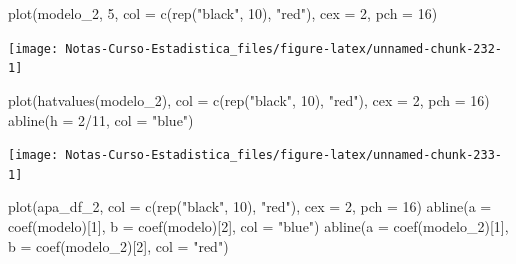\documentclass[
  12pt,
]{book}
\newenvironment{Shaded}{\begin{snugshade}}{\end{snugshade}}
\newcommand{\AttributeTok}[1]{\textcolor[rgb]{0.77,0.63,0.00}{#1}}
\newcommand{\DecValTok}[1]{\textcolor[rgb]{0.00,0.00,0.81}{#1}}
\newcommand{\FunctionTok}[1]{\textcolor[rgb]{0.00,0.00,0.00}{#1}}
\newcommand{\NormalTok}[1]{#1}
\newcommand{\SpecialCharTok}[1]{\textcolor[rgb]{0.00,0.00,0.00}{#1}}
\newcommand{\StringTok}[1]{\textcolor[rgb]{0.31,0.60,0.02}{#1}}
\theoremstyle{definition}
\theoremstyle{definition}
\theoremstyle{definition}
\theoremstyle{remark}
\begin{document}
\begin{Shaded}
\begin{Highlighting}[]
\FunctionTok{plot}\NormalTok{(modelo\_2, }\DecValTok{5}\NormalTok{, }\AttributeTok{col =} \FunctionTok{c}\NormalTok{(}\FunctionTok{rep}\NormalTok{(}\StringTok{"black"}\NormalTok{, }\DecValTok{10}\NormalTok{), }\StringTok{"red"}\NormalTok{), }
    \AttributeTok{cex =} \DecValTok{2}\NormalTok{, }\AttributeTok{pch =} \DecValTok{16}\NormalTok{)}
\end{Highlighting}
\end{Shaded}

\begin{center}\texttt{[image: Notas-Curso-Estadistica\_files/figure-latex/unnamed-chunk-232-1]} \end{center}

\begin{Shaded}
\begin{Highlighting}[]
\FunctionTok{plot}\NormalTok{(}\FunctionTok{hatvalues}\NormalTok{(modelo\_2), }\AttributeTok{col =} \FunctionTok{c}\NormalTok{(}\FunctionTok{rep}\NormalTok{(}\StringTok{"black"}\NormalTok{, }\DecValTok{10}\NormalTok{), }
    \StringTok{"red"}\NormalTok{), }\AttributeTok{cex =} \DecValTok{2}\NormalTok{, }\AttributeTok{pch =} \DecValTok{16}\NormalTok{)}
\FunctionTok{abline}\NormalTok{(}\AttributeTok{h =} \DecValTok{2}\SpecialCharTok{/}\DecValTok{11}\NormalTok{, }\AttributeTok{col =} \StringTok{"blue"}\NormalTok{)}
\end{Highlighting}
\end{Shaded}

\begin{center}\texttt{[image: Notas-Curso-Estadistica\_files/figure-latex/unnamed-chunk-233-1]} \end{center}

\begin{Shaded}
\begin{Highlighting}[]
\FunctionTok{plot}\NormalTok{(apa\_df\_2, }\AttributeTok{col =} \FunctionTok{c}\NormalTok{(}\FunctionTok{rep}\NormalTok{(}\StringTok{"black"}\NormalTok{, }\DecValTok{10}\NormalTok{), }\StringTok{"red"}\NormalTok{), }\AttributeTok{cex =} \DecValTok{2}\NormalTok{, }
    \AttributeTok{pch =} \DecValTok{16}\NormalTok{)}
\FunctionTok{abline}\NormalTok{(}\AttributeTok{a =} \FunctionTok{coef}\NormalTok{(modelo)[}\DecValTok{1}\NormalTok{], }\AttributeTok{b =} \FunctionTok{coef}\NormalTok{(modelo)[}\DecValTok{2}\NormalTok{], }\AttributeTok{col =} \StringTok{"blue"}\NormalTok{)}
\FunctionTok{abline}\NormalTok{(}\AttributeTok{a =} \FunctionTok{coef}\NormalTok{(modelo\_2)[}\DecValTok{1}\NormalTok{], }\AttributeTok{b =} \FunctionTok{coef}\NormalTok{(modelo\_2)[}\DecValTok{2}\NormalTok{], }
    \AttributeTok{col =} \StringTok{"red"}\NormalTok{)}
\end{Highlighting}
\end{Shaded}
\end{document}

